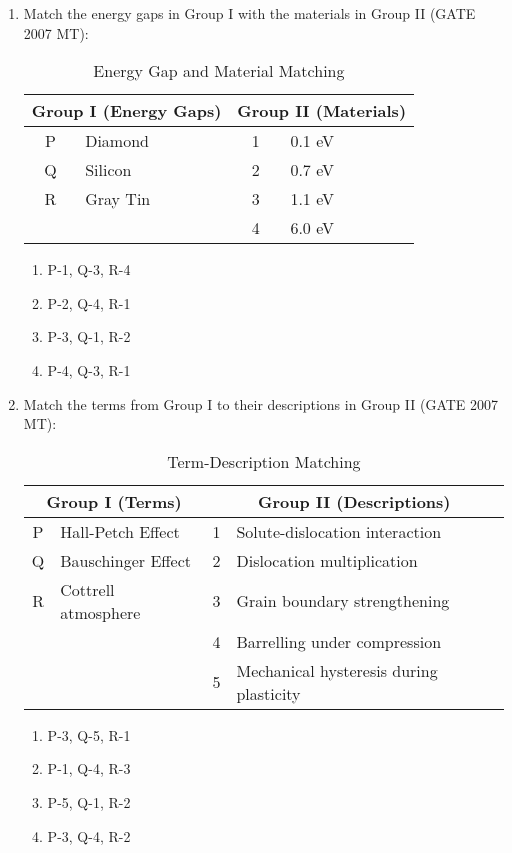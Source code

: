 \documentclass[12pt]{article}
\begin{document}
\begin{enumerate}

\item Match the energy gaps in Group I with the materials in Group II (GATE 2007 MT):\\[1ex]
\begin{table}[h!]
\centering
\caption{Energy Gap and Material Matching}
\label{tab:q64_matching}
\begin{tabular}{|c|l||c|l|}
\hline
\multicolumn{2}{|c||}{\textbf{Group I (Energy Gaps)}} & \multicolumn{2}{c|}{\textbf{Group II (Materials)}} \\
\hline
P & Diamond       & 1 & 0.1 eV \\
Q & Silicon       & 2 & 0.7 eV \\
R & Gray Tin      & 3 & 1.1 eV \\
                    &   & 4 & 6.0 eV \\
\hline
\end{tabular}
\end{table}
  \begin{enumerate}[label=(\Alph*)]
    \item P-1, Q-3, R-4
    \item P-2, Q-4, R-1
    \item P-3, Q-1, R-2
    \item P-4, Q-3, R-1
  \end{enumerate}


\item Match the terms from Group I to their descriptions in Group II (GATE 2007 MT):\\[1ex]
\begin{table}[h!]
\centering
\caption{Term-Description Matching}
\label{tab:q65_matching}
\begin{tabular}{|c|l||c|l|}
\hline
\multicolumn{2}{|c||}{\textbf{Group I (Terms)}} & \multicolumn{2}{c|}{\textbf{Group II (Descriptions)}} \\
\hline
P & Hall-Petch Effect     & 1 & Solute-dislocation interaction \\
Q & Bauschinger Effect    & 2 & Dislocation multiplication \\
R & Cottrell atmosphere   & 3 & Grain boundary strengthening \\
                          &   & 4 & Barrelling under compression \\
                          &   & 5 & Mechanical hysteresis during plasticity \\
\hline
\end{tabular}
\end{table}
  \begin{enumerate}[label=(\Alph*)]
    \item P-3, Q-5, R-1
    \item P-1, Q-4, R-3
    \item P-5, Q-1, R-2
    \item P-3, Q-4, R-2
  \end{enumerate}


\end{enumerate}
\end{document}
